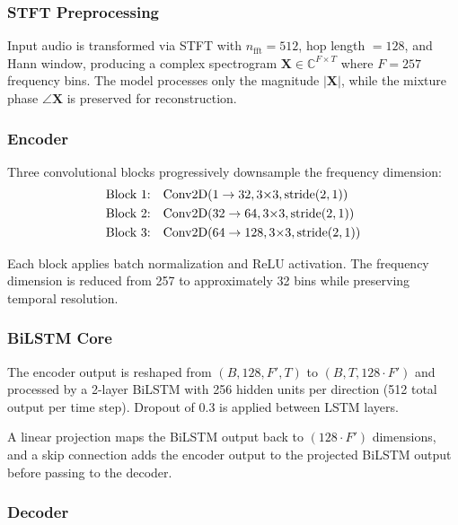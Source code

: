 \documentclass[conference]{IEEEtran}
\begin{document}
\subsubsection{STFT Preprocessing}

Input audio is transformed via STFT with $n_{\text{fft}} = 512$, hop length $= 128$, and Hann window, producing a complex spectrogram $\mathbf{X} \in \mathbb{C}^{F \times T}$ where $F = 257$ frequency bins. The model processes only the magnitude $|\mathbf{X}|$, while the mixture phase $\angle \mathbf{X}$ is preserved for reconstruction.

\subsubsection{Encoder}

Three convolutional blocks progressively downsample the frequency dimension:
\begin{align}
\text{Block 1:} &\quad \text{Conv2D}(1 \rightarrow 32, 3{\times}3, \text{stride}(2,1)) \notag \\
\text{Block 2:} &\quad \text{Conv2D}(32 \rightarrow 64, 3{\times}3, \text{stride}(2,1)) \notag \\
\text{Block 3:} &\quad \text{Conv2D}(64 \rightarrow 128, 3{\times}3, \text{stride}(2,1)) \notag
\end{align}

Each block applies batch normalization and ReLU activation. The frequency dimension is reduced from 257 to approximately 32 bins while preserving temporal resolution.

\subsubsection{BiLSTM Core}

The encoder output is reshaped from $(B, 128, F', T)$ to $(B, T, 128 \cdot F')$ and processed by a 2-layer BiLSTM with 256 hidden units per direction (512 total output per time step). Dropout of 0.3 is applied between LSTM layers. 

A linear projection maps the BiLSTM output back to $(128 \cdot F')$ dimensions, and a skip connection adds the encoder output to the projected BiLSTM output before passing to the decoder.

\subsubsection{Decoder}
\end{document}

